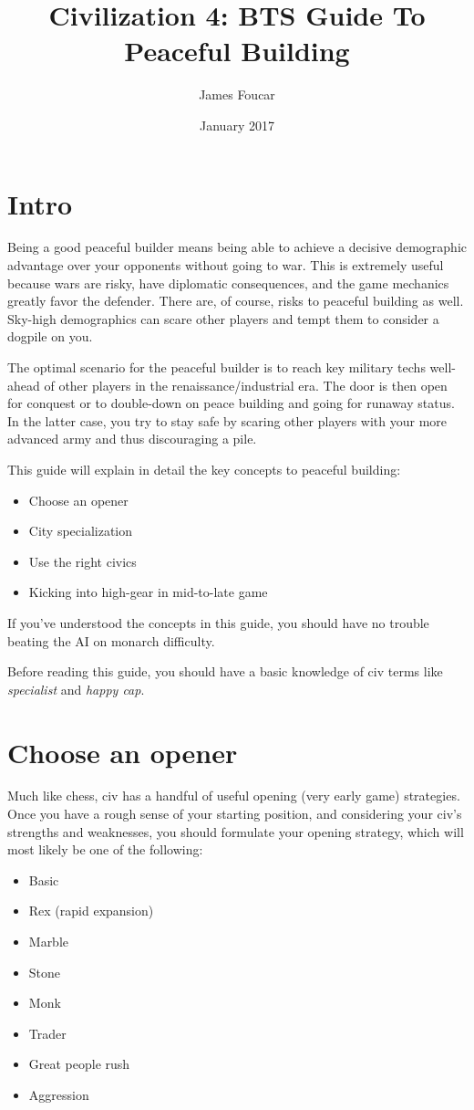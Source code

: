 \documentclass[10pt]{article}
\title{Civilization 4: BTS Guide To Peaceful Building}
\author{James Foucar}
\date{January 2017}
\begin{document}
\section*{Intro}

Being a good peaceful builder means being able to achieve a decisive demographic advantage
over your opponents without going to war. This is extremely useful because wars are risky, have
diplomatic consequences, and the game mechanics greatly favor the defender. There are, of course,
risks to peaceful building as well. Sky-high demographics can scare other players and tempt them
to consider a dogpile on you.

The optimal scenario for the peaceful builder is to reach key military
techs well-ahead of other players in the renaissance/industrial era. The door is then open for conquest
or to double-down on peace building and going for runaway status. In the latter case, you try to stay
safe by scaring other players with your more advanced army and thus discouraging a pile.

This guide will explain in detail the key concepts to peaceful building:
\begin{itemize}
\item Choose an opener
\item City specialization
\item Use the right civics
\item Kicking into high-gear in mid-to-late game
\end{itemize}

If you've understood the concepts in this guide, you should have no trouble beating the AI
on monarch difficulty.

Before reading this guide, you should have a basic knowledge of civ terms like \emph{specialist}
and \emph{happy cap}.

\section*{Choose an opener}

Much like chess, civ has a handful of useful opening (very early game) strategies. Once you
have a rough sense of your starting position, and considering your civ's strengths and weaknesses,
you should formulate your opening strategy, which will most likely be one of the following:
\begin{itemize}
\item Basic
\item Rex (rapid expansion)
\item Marble
\item Stone
\item Monk
\item Trader
\item Great people rush
\item Aggression
\end{itemize}
\end{document}
